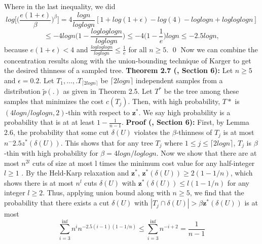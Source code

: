 \documentclass[oneside]{projectpaper} %
\begin{document}
Where in the last inequality, we did
\begin{equation*}
log\Bigg[\bigg(\frac{e(1 + \epsilon)}{\beta}\bigg)^\beta\Bigg] = 4\frac{logn}{loglogn}[1 + log(1 + \epsilon) - log(4) - log log n + logloglogn]
\end{equation*}
\begin{equation*}
\leq -4logn\bigg(1-\frac{logloglogn}{loglogn}\bigg) \leq -4\bigg(1 - \frac{1}{e}\bigg)logn \leq -2.5logn,
\end{equation*}
\newline
because $e(1 + \epsilon) < 4$ and $\frac{logloglogn}{loglogn} \leq \frac{1}{e}$ for all $n \geq 5$. \hfill\qed
\newline
Now we can combine the concentration results along with the union-bounding technique of Karger \cite{Kar93} to get the desired thinness of a sampled tree.
\newline
\newline
\textbf{Theorem 2.7 (\cite{AGM10}, Section 6):} Let $n \geq 5$ and $\epsilon = 0.2$. Let $T_1,...,.T_{\lceil 2logn \rceil}$ be $\lceil 2logn \rceil$ independent samples from a distribution $\tilde{p}(.)$ as given in Theorem 2.5. Let $T^*$ be the tree among these samples that minimizes the cost $c(T_j)$. Then, with high probability, $T*$ is $(4log n / log log n, 2)$-thin with respect to $\textbf{z}^*$.
\newline
We say high probability is a probability that is at at least $1 - \frac{1}{n - 1}$.
\newline
\newline
\textbf{Proof (\cite{AGM10}, Section 6):} First, by Lemma 2.6, the probability that some cut $\delta(U)$ violates the $\beta$-thinness of $T_j$ is at most $n^-2.5z^*(\delta(U))$. This shows that for any tree $T_j$ where $1 \leq j \leq \lceil 2logn \rceil$, $T_j$ is $\beta$-thin with high probability for $\beta = 4logn / loglogn$. \newline
\indent Now we show that there are at most $n^{2l}$ cuts of size at most l times the minimum cost value for any half-integer $l \geq 1$ \cite{Kar93}. By the Held-Karp relaxation and $\textbf{z}^*$, $\textbf{z}^*(\delta(U)) \geq 2(1 - 1/n)$, which shows there is at most $n^l$ cuts $\delta(U)$ with $\textbf{z}^*(\delta(U)) \leq l(1 - 1/n)$ for any integer $l \geq 2$. Thus, applying union bound \cite{Kar93} along with $n \geq 5$, we find that the probability that there exists a cut $\delta(U)$ with $|T_j \cap \delta(U)| > \beta \textbf{z}^*(\delta(U))$ is at most
\begin{equation*}
\sum\limits_{i = 3}^{\inf}n^in^{-2.5(i-1)(1-1/n)} \leq \sum\limits_{i = 3}^{\inf}n^{-i + 2} = \frac{1}{n - 1}
\end{equation*}
\end{document}
